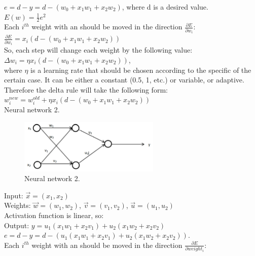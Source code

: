 \documentclass[a4paper, 12pt]{article}
\begin{document}
$e = d - y = d - (w_0 + x_1w_1 + x_2w_2)$, where d is a desired value.\\

$E(w) = \frac{1}{2}e^2$\\

Each $i^{th}$ weight with an should be moved in the direction $\frac{\partial E}{\partial w_i}$:\\

$\frac{\partial E}{\partial w_i} = x_i(d - (w_0 + x_1w_1 + x_2w_2))$\\

So, each step will change each weight by the following value:\\
$\Delta w_i = \eta x_i(d - (w_0 + x_1w_1 + x_2w_2))$,\\
where $\eta$ is a learning rate that should be chosen according to the specific of the certain case. It can be either a constant (0.5, 1, etc.) or variable, or adaptive.\\

Therefore the delta rule will take the following form:\\

$w_i^{new} = w_i^{old} + \eta x_i(d - (w_0 + x_1w_1 + x_2w_2))$\\

Neural network 2.

\begin{figure}[h]
  \centering
  \caption{Neural network 2. \label{fig:nn2}}
  \includegraphics[width=0.6\textwidth]{nn2}
\end{figure}

Input: 	$\vec{x} = (x_1, x_2)$\\
Weights: 	$\vec{w} = (w_1, w_2)$, $\vec{v} = (v_1, v_2)$, $\vec{u} = (u_1, u_2)$\\
Activation function is linear, so:\\
Output: $y = u_1(x_1w_1 + x_2v_1) + u_2(x_1w_2 + x_2v_2)$\\

$e = d - y = d - (u_1(x_1w_1 + x_2v_1) + u_2(x_1w_2 + x_2v_2))$.\\

Each $i^{th}$ weight with an should be moved in the direction $\frac{\partial E}{\partial weight_i}$:\\
\end{document}
